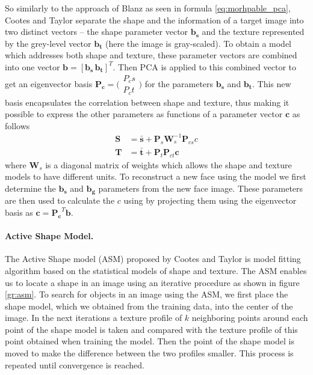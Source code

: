 \documentclass[11pt,a4paper]{report}
\begin{document}
So similarly to the approach of Blanz as seen in formula \ref{eq:morhpable_pca}, Cootes and Taylor separate the shape and the information of a target image into
two distinct vectors -- the shape parameter vector $\mathbf{b_s}$ and the texture
represented by the grey-level vector $\mathbf{b_t}$ (here the image is
gray-scaled). To obtain a model which addresses both shape and texture, these
parameter vectors are combined into one vector $\mathbf{b} = [\mathbf{b_s}\, \mathbf{b_t}]^T$. Then PCA is applied to this combined vector to get an
eigenvector basis $\mathbf{P_c} =
\bigl( \begin{smallmatrix}P_cs\\P_ct\end{smallmatrix} \bigr)$ for the parameters $\mathbf{b_s}$ and
$\mathbf{b_t}$. This new basis encapsulates the correlation between shape and
texture, thus making it possible to express the other
parameters as functions of a parameter vector $\mathbf{c}$ as follows
\begin{align} \label{gth:shape_mod} 
\mathbf{S} &= \mathbf{\bar{s}} + \mathbf{P}_s \mathbf{W}_s^{-1} \mathbf{P}_{cs}c\\
\label{gth:texture_mod}
\mathbf{T} &= \mathbf{\bar{t}} + \mathbf{P}_t \mathbf{P}_{ct} \mathbf{c}
\end{align}
where $\mathbf{W}_s$ is a diagonal matrix of weights which allows the shape and
texture models to have different units. To reconstruct a new face using the model we first determine the $\mathbf{b_s}$ and
$\mathbf{b_g}$ parameters from the new face image. These parameters are then
used to calculate the $c$ using by projecting them using the eigenvector basis
as $\mathbf{c} = \mathbf{P_c}^T\mathbf{b}$.

\paragraph{Active Shape Model.}
The Active Shape model (ASM) proposed by Cootes and Taylor is model fitting
algorithm based
on the statistical models of shape and texture. The ASM enables us to locate a
shape in an image using an iterative
procedure as shown in figure \ref{gr:asm}. To search for objects in an image
using the ASM, we first place the shape model, which we obtained from the training data, into
the center of the image. In the next iterations a texture profile of $k$
neighboring points around each point of the shape model is taken and compared
with the texture profile of this point obtained when training the model. Then
the point of the shape model is moved to make the difference between the two
profiles smaller. This process is repeated until convergence is reached.
\end{document}
